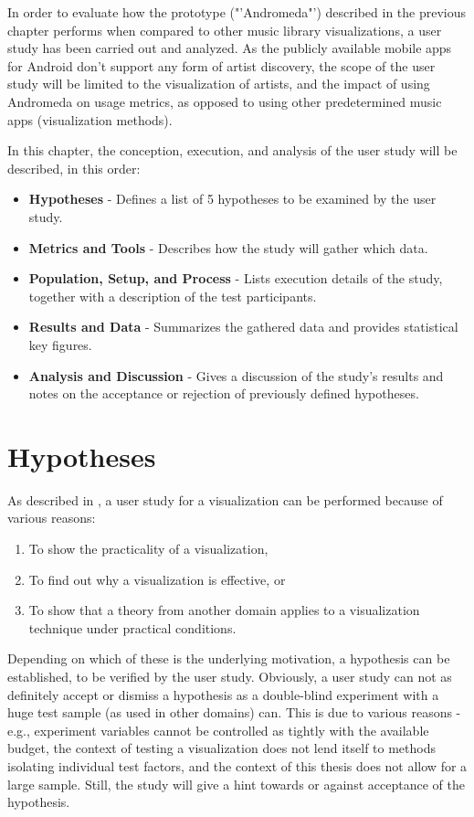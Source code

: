 In order to evaluate how the prototype ("'Andromeda"') described in the previous chapter performs when compared to other music library visualizations, a user study has been carried out and analyzed. As the publicly available mobile apps for Android don't support any form of artist discovery, the scope of the user study will be limited to the visualization of artists, and the impact of using Andromeda on usage metrics, as opposed to using other predetermined music apps (visualization methods).

In this chapter, the conception, execution, and analysis of the user study will be described, in this order:

\begin{itemize}
	\item \textbf {Hypotheses} - Defines a list of 5 hypotheses to be examined by the user study.
	\item \textbf {Metrics and Tools} - Describes how the study will gather which data.
	\item \textbf {Population, Setup, and Process} - Lists execution details of the study, together with a description of the test participants.
	\item \textbf {Results and Data} - Summarizes the gathered data and provides statistical key figures.
	\item \textbf {Analysis and Discussion} - Gives a discussion of the study's results and notes on the acceptance or rejection of previously defined hypotheses.
\end{itemize}

\section{Hypotheses}

As described in \cite{Christopher03thoughtson}, a user study for a visualization can be performed because of various reasons: 

\begin{enumerate}
	\item To show the practicality of a visualization,
	\item To find out why a visualization is effective, or
	\item To show that a theory from another domain applies to a visualization technique under practical conditions.
\end{enumerate}
	
Depending on which of these is the underlying motivation, a hypothesis can be established, to be verified by the user study. Obviously, a user study can not as definitely accept or dismiss a hypothesis as a double-blind experiment with a huge test sample (as used in other domains) can. This is due to various reasons - e.g., experiment variables cannot be controlled as tightly with the available budget, the context of testing a visualization does not lend itself to methods isolating individual test factors, and the context of this thesis does not allow for a large sample. Still, the study will give a hint towards or against acceptance of the hypothesis.

